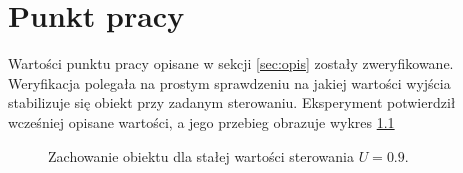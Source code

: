 \chapter{Punkt pracy}
Wartości punktu pracy opisane w sekcji \ref{sec:opis} zostały
zweryfikowane. Weryfikacja polegała na prostym sprawdzeniu na jakiej
wartości wyjścia stabilizuje się obiekt przy zadanym sterowaniu.
Eksperyment potwierdził wcześniej opisane wartości, a jego przebieg
obrazuje wykres \ref{fig:pkt_prac}

\begin{figure}[tb]
\centering
{}
\caption{Zachowanie obiektu dla stałej wartości sterowania $U = 0.9$.}
\label{fig:pkt_prac}
\end{figure}

